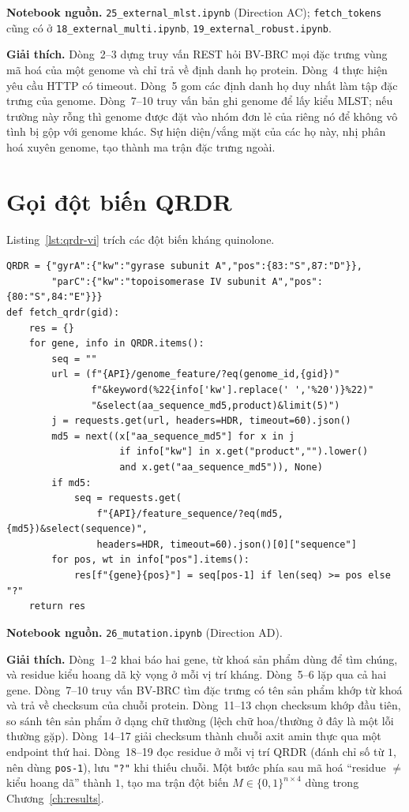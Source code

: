 \documentclass[../main.tex]{subfiles}
\begin{document}
\noindent\textbf{Notebook nguồn.} \texttt{25\_external\_mlst.ipynb} (Direction AC); \texttt{fetch\_tokens} cũng có ở \texttt{18\_external\_multi.ipynb}, \texttt{19\_external\_robust.ipynb}.

\noindent\textbf{Giải thích.} Dòng~2--3 dựng truy vấn REST hỏi BV-BRC mọi đặc trưng vùng mã hoá của một genome và chỉ trả về định danh họ protein. Dòng~4 thực hiện yêu cầu HTTP có timeout. Dòng~5 gom các định danh họ duy nhất làm tập đặc trưng của genome. Dòng~7--10 truy vấn bản ghi genome để lấy kiểu MLST; nếu trường này rỗng thì genome được đặt vào nhóm đơn lẻ của riêng nó để không vô tình bị gộp với genome khác. Sự hiện diện/vắng mặt của các họ này, nhị phân hoá xuyên genome, tạo thành ma trận đặc trưng ngoài.

\section{Gọi đột biến QRDR}

Listing~\ref{lst:qrdr-vi} trích các đột biến kháng quinolone.

\begin{lstlisting}[caption={Trích residue QRDR cho gyrA/parC.},label=lst:qrdr-vi]
QRDR = {"gyrA":{"kw":"gyrase subunit A","pos":{83:"S",87:"D"}},
        "parC":{"kw":"topoisomerase IV subunit A","pos":{80:"S",84:"E"}}}
def fetch_qrdr(gid):
    res = {}
    for gene, info in QRDR.items():
        seq = ""
        url = (f"{API}/genome_feature/?eq(genome_id,{gid})"
               f"&keyword(%22{info['kw'].replace(' ','%20')}%22)"
               "&select(aa_sequence_md5,product)&limit(5)")
        j = requests.get(url, headers=HDR, timeout=60).json()
        md5 = next((x["aa_sequence_md5"] for x in j
                    if info["kw"] in x.get("product","").lower()
                    and x.get("aa_sequence_md5")), None)
        if md5:
            seq = requests.get(
                f"{API}/feature_sequence/?eq(md5,{md5})&select(sequence)",
                headers=HDR, timeout=60).json()[0]["sequence"]
        for pos, wt in info["pos"].items():
            res[f"{gene}{pos}"] = seq[pos-1] if len(seq) >= pos else "?"
    return res
\end{lstlisting}

\noindent\textbf{Notebook nguồn.} \texttt{26\_mutation.ipynb} (Direction AD).

\noindent\textbf{Giải thích.} Dòng~1--2 khai báo hai gene, từ khoá sản phẩm dùng để tìm chúng, và residue kiểu hoang dã kỳ vọng ở mỗi vị trí kháng. Dòng~5--6 lặp qua cả hai gene. Dòng~7--10 truy vấn BV-BRC tìm đặc trưng có tên sản phẩm khớp từ khoá và trả về checksum của chuỗi protein. Dòng~11--13 chọn checksum khớp đầu tiên, so sánh tên sản phẩm ở dạng chữ thường (lệch chữ hoa/thường ở đây là một lỗi thường gặp). Dòng~14--17 giải checksum thành chuỗi axit amin thực qua một endpoint thứ hai. Dòng~18--19 đọc residue ở mỗi vị trí QRDR (đánh chỉ số từ $1$, nên dùng \texttt{pos-1}), lưu \texttt{"?"} khi thiếu chuỗi. Một bước phía sau mã hoá ``residue $\neq$ kiểu hoang dã'' thành $1$, tạo ma trận đột biến $M\in\{0,1\}^{n\times 4}$ dùng trong Chương~\ref{ch:results}.
\end{document}
